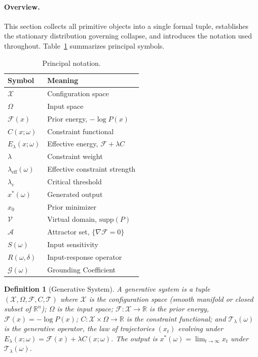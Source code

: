 \documentclass[twocolumn,10pt]{article}
\theoremstyle{thmstyle}
\theoremstyle{defstyle}
\newtheorem{definition}[theorem]{Definition}
\newcommand{\Xspace}{\mathcal{X}}
\newcommand{\Fprior}{\mathcal{F}}
\newcommand{\GC}{\mathcal{G}}
\newcommand{\leff}{\lambda_{\mathrm{eff}}}
\newcommand{\Vdomain}{\mathcal{V}}
\newcommand{\Aset}{\mathcal{A}}
\newcommand{\Rop}{R}
\begin{document}
\paragraph{Overview.}
This section collects all primitive objects into a single formal tuple,
establishes the stationary distribution governing collapse, and
introduces the notation used throughout. Table~\ref{tab:notation}
summarizes principal symbols.

\begin{table}[t]
\centering
\caption{Principal notation.}
\label{tab:notation}
\small
\begin{tabular}{@{}ll@{}}
\toprule
Symbol & Meaning \\
\midrule
$\Xspace$ & Configuration space \\
$\Omega$ & Input space \\
$\Fprior(x)$ & Prior energy, $-\log P(x)$ \\
$C(x;\omega)$ & Constraint functional \\
$E_\lambda(x;\omega)$ & Effective energy, $\Fprior + \lambda C$ \\
$\lambda$ & Constraint weight \\
$\leff(\omega)$ & Effective constraint strength \\
$\lambda_c$ & Critical threshold \\
$x^*(\omega)$ & Generated output \\
$x_0$ & Prior minimizer \\
$\Vdomain$ & Virtual domain, $\mathrm{supp}(P)$ \\
$\Aset$ & Attractor set, $\{\nabla\Fprior = 0\}$ \\
$S(\omega)$ & Input sensitivity \\
$\Rop(\omega,\delta)$ & Input-response operator \\
$\GC(\omega)$ & Grounding Coefficient \\
\bottomrule
\end{tabular}
\end{table}

\begin{definition}[Generative System]
\label{def:system}
A \emph{generative system} is a tuple
$(\Xspace, \Omega, \Fprior, C, \mathcal{T})$ where $\Xspace$ is the
\emph{configuration space} (smooth manifold or closed subset of
$\mathbb{R}^n$); $\Omega$ is the \emph{input space}; $\Fprior :
\Xspace\to\mathbb{R}$ is the \emph{prior energy}, $\Fprior(x) = -\log
P(x)$; $C : \Xspace\times\Omega\to\mathbb{R}$ is the \emph{constraint
functional}; and $\mathcal{T}_\lambda(\omega)$ is the \emph{generative
operator}, the law of trajectories $(x_t)$ evolving under
$E_\lambda(x;\omega) = \Fprior(x) + \lambda C(x;\omega)$.
The output is $x^*(\omega) = \lim_{t\to\infty} x_t$ under
$\mathcal{T}_\lambda(\omega)$.
\end{definition}
\end{document}
